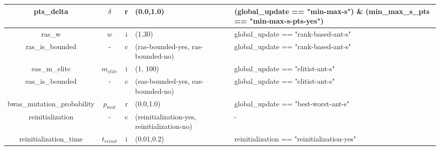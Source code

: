 \documentclass[11pt,a4paper,oneside]{book}
\begin{document}
\begin{table}[]
\begin{tabular}{|c|c|c|p{4cm}|p{4cm}|}
pts\_delta                      & $\delta$   & r    & (0.0,1.0)                                                                      & (global\_update == "min-max-s") \& (min\_max\_s\_pts == "min-max-s-pts-yes")                  \\ \hline
ras\_w                          & $w$        & i    & (1,30)                                                                         & global\_update == "rank-based-ant-s"                                                          \\ \hline
ras\_is\_bounded                & -          & c    & (ras-bounded-yes, ras-bounded-no)                                               & global\_update == "rank-based-ant-s"                                                          \\ \hline
eas\_m\_elite                   & $m_{elite}$ & i   & (1, 100)                                                                       & global\_update == "elitist-ant-s"                                                             \\ \hline
eas\_is\_bounded                & -          & c    & (eas-bounded-yes, eas-bounded-no)                                               & global\_update == "elitist-ant-s"                                                             \\ \hline
bwas\_mutation\_probability     & $p_{mut}$    & r    & (0.0,1.0)                                                                      & global\_update == "best-worst-ant-s"                                                          \\ \hline
reinitialization                & -          & c    & (reinitialization-yes, reinitialization-no)                                     & -                                                                                             \\ \hline
reinitialization\_time          & $t_{reinit}$ & i    & (0.01,0.2)                                                                     & reinitialization == "reinitialization-yes"                                                    \\ \hline
\end{tabular}
\end{table}
\end{document}
